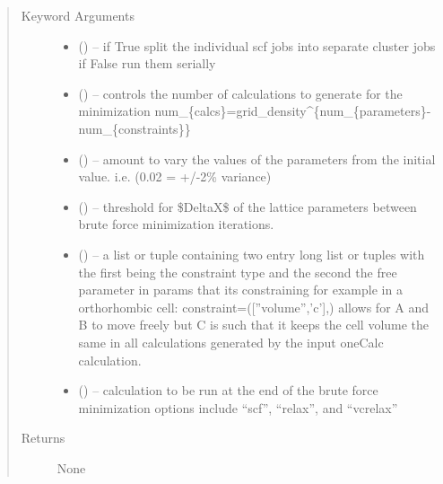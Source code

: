 \documentclass[letterpaper,10pt,english]{sphinxmanual}
\begin{document}
\begin{fulllineitems}
\begin{fulllineitems}
\begin{quote}
\begin{description}
\item[{Keyword Arguments}] \leavevmode\begin{itemize}
\item {} 
 () -- if True split the individual scf jobs into separate cluster jobs
if False run them serially

\item {} 
 () -- controls the number of calculations to generate for the minimization
num\_\{calcs\}=grid\_density\textasciicircum{}\{num\_\{parameters\}-num\_\{constraints\}\}

\item {} 
 () -- amount to vary the values of the parameters from the initial
value. i.e. (0.02 = +/-2\% variance)

\item {} 
 () -- threshold for \$DeltaX\$ of the lattice parameters between brute force
minimization iterations.

\item {} 
 () -- a list or tuple containing two entry long list or tuples with
the first being the constraint type and the second the free
parameter in params that its constraining for example in a
orthorhombic cell: constraint=({[}''volume'','c'{]},) allows for A and B
to move freely but C is such that it keeps the cell volume the same
in all calculations generated by the input oneCalc calculation.

\item {} 
 () -- calculation to be run at the end of the brute force minimization
options include ``scf'', ``relax'', and ``vcrelax''

\end{itemize}

\item[{Returns}] \leavevmode
None

\end{description}\end{quote}

\end{fulllineitems}



\end{fulllineitems}
\end{document}

